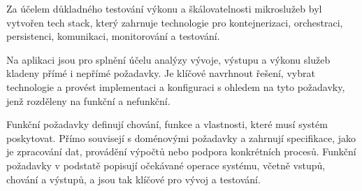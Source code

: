 

Za účelem důkladného testování výkonu a škálovatelnosti mikroslužeb byl vytvořen tech stack, který zahrnuje technologie pro kontejnerizaci, orchestraci, persistenci, komunikaci, monitorování a testování. 


Na aplikaci jsou pro splnění účelu analýzy vývoje, výstupu a výkonu služeb kladeny přímé i nepřímé požadavky. Je klíčové navrhnout řešení, vybrat technologie a provést implementaci a konfiguraci s ohledem na tyto požadavky, jenž rozděleny na funkční a nefunkční.


Funkční požadavky definují chování, funkce a vlastnosti, které musí systém poskytovat. Přímo souvisejí s doménovými požadavky a zahrnují specifikace, jako je zpracování dat, provádění výpočtů nebo podpora konkrétních procesů. Funkční požadavky v podstatě popisují očekávané operace systému, včetně vstupů, chování a výstupů, a jsou tak klíčové pro vývoj a testování.

